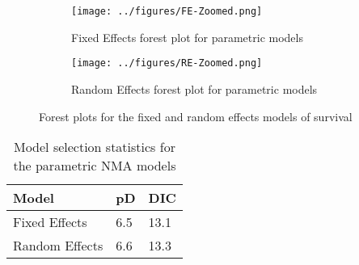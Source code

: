 \begin{figure}[h]
    \centering
    \begin{subfigure}[b]{0.45\textwidth}
        \centering
        \texttt{[image: ../figures/FE-Zoomed.png]}
        \caption{Fixed Effects forest plot for parametric models}
        \label{fig:FEForestParam}
    \end{subfigure}
    \hfill
    \begin{subfigure}[b]{0.45\textwidth}
        \centering
        \texttt{[image: ../figures/RE-Zoomed.png]}
        \caption{Random Effects forest plot for parametric models}
        \label{fig:REForestParam}
    \end{subfigure}
    \caption{Forest plots for the fixed and random effects models of survival}
    \label{fig:forests_param}
\end{figure}

\begin{table}[h]
    \center
    \begin{tabular}{lll}
    \hline
    Model          & pD  & DIC  \\ \hline
    Fixed Effects  & 6.5 & 13.1   \\
    Random Effects & 6.6 & 13.3 \\ \hline
    \end{tabular}
    \caption{Model selection statistics for the parametric NMA models}
    \label{paramDIC}
\end{table}